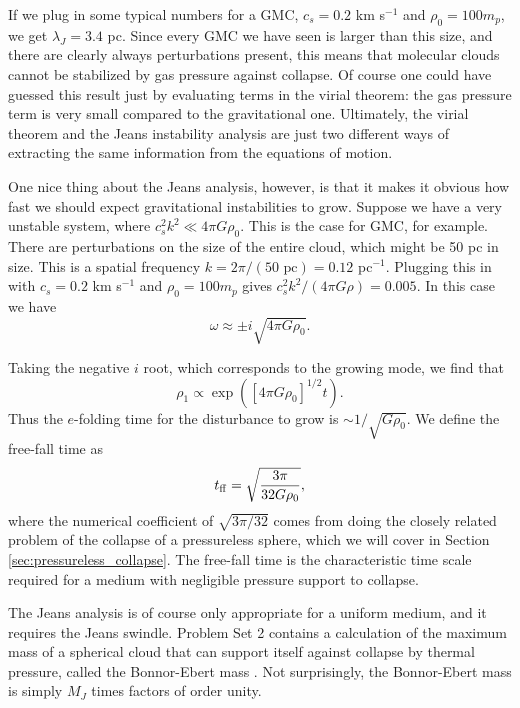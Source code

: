 If we plug in some typical numbers for a GMC, $c_s=0.2$ km s$^{-1}$ and $\rho_0 = 100 m_p$, we get $\lambda_J = 3.4$ pc. Since every GMC we have seen is larger than this size, and there are clearly always perturbations present, this means that molecular clouds cannot be stabilized by gas pressure against collapse. Of course one could have guessed this result just by evaluating terms in the virial theorem: the gas pressure term is very small compared to the gravitational one. Ultimately, the virial theorem and the Jeans instability analysis are just two different ways of extracting the same information from the equations of motion.

One nice thing about the Jeans analysis, however, is that it makes it obvious how fast we should expect gravitational instabilities to grow. Suppose we have a very unstable system, where $c_s^2 k^2 \ll 4 \pi G \rho_0$. This is the case for GMC, for example. There are perturbations on the size of the entire cloud, which might be 50 pc in size. This is a spatial frequency $k=2\pi/(50\mbox{ pc}) = 0.12$ pc$^{-1}$. Plugging this in with $c_s = 0.2$ km s$^{-1}$ and $\rho_0=100 m_p$ gives $c_s^2 k^2 / (4\pi G \rho) = 0.005$.
In this case we have
\begin{equation}
\omega \approx \pm i \sqrt{4\pi G\rho_0}.
\end{equation}

Taking the negative $i$ root, which corresponds to the growing mode, we find that
\begin{equation}
\rho_1 \propto \exp([4\pi G \rho_0]^{1/2} t).
\end{equation}
Thus the $e$-folding time for the disturbance to grow is $\sim 1/\sqrt{G\rho_0}$. We define the free-fall time as
\begin{equation}
t_{\rm ff} = \sqrt{\frac{3\pi}{32 G \rho_0}},
\end{equation}
where the numerical coefficient of $\sqrt{3\pi/32}$ comes from doing the closely related problem of the collapse of a pressureless sphere, which we will cover in Section \ref{sec:pressureless_collapse}. The free-fall time is the characteristic time scale required for a medium with negligible pressure support to collapse.

The Jeans analysis is of course only appropriate for a uniform medium, and it requires the Jeans swindle. Problem Set 2 contains a calculation of the maximum mass of a spherical cloud that can support itself against collapse by thermal pressure, called the Bonnor-Ebert mass \citep{ebert55a, bonnor56a}. Not surprisingly, the Bonnor-Ebert mass is simply $M_J$ times factors of order unity.


